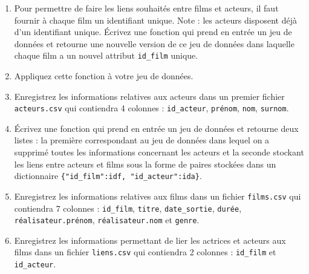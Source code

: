 \documentclass[11pt,a4paper]{article}
\begin{document}
\begin{enumerate}
    \item Pour permettre de faire les liens souhaités entre films et acteurs, il faut fournir à chaque film un identifiant unique. Note : les acteurs disposent déjà d'un identifiant unique. Écrivez une fonction qui prend en entrée un jeu de données et retourne une nouvelle version de ce jeu de données dans laquelle chaque film a un nouvel attribut \verb+id_film+ unique.
    
    \item Appliquez cette fonction à votre jeu de données.
    
    \item Enregistrez les informations relatives aux acteurs dans un premier fichier \verb+acteurs.csv+ qui contiendra 4 colonnes : \verb+id_acteur+, \verb+prénom+, \verb+nom+, \verb+surnom+.
    
    \item Écrivez une fonction qui prend en entrée un jeu de données et retourne deux listes : la première correspondant au jeu de données dans lequel on a supprimé toutes les informations concernant les acteurs et la seconde stockant les liens entre acteurs et films sous la forme de paires stockées dans un dictionnaire \verb+{"id_film":idf, "id_acteur":ida}+.
    
    \item Enregistrez les informations relatives aux films dans un fichier \verb+films.csv+ qui contiendra 7 colonnes : \verb+id_film+, \verb+titre+, \verb+date_sortie+, \verb+durée+, \verb+réalisateur.prénom+, \verb+réalisateur.nom+ et \verb+genre+.
    
    \item Enregistrez les informations permettant de lier les actrices et acteurs aux films dans un fichier \verb+liens.csv+ qui contiendra 2 colonnes : \verb+id_film+ et \verb+id_acteur+.
\end{enumerate}
\end{document}
